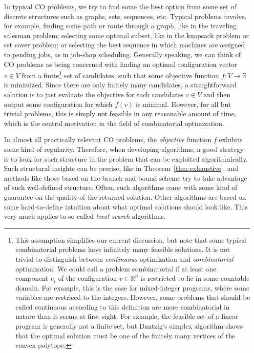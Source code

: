 \documentclass[a4paper]{report}
\theoremstyle{definition}
\theoremstyle{plain}
\begin{document}
In typical CO problems, we try to find some the best option from some set of
discrete structures such as graphs, sets, sequences, etc.
%
Typical problems involve, for example, finding some path or route through a
graph, like in the traveling salesman problem; selecting some optimal subset,
like in the knapsack problem or set cover problem; or selecting the best
sequence in which machines are assigned to pending jobs, as in job-shop
scheduling.
%
Generally speaking, we can think of CO problems as being concerned with finding
an optimal configuration vector $v \in V$ from a finite\footnote{This assumption
  simplifies our current discussion, but note that some typical combinatorial
  problems have infinitely many feasible solutions.
%
  It is not trivial to distinguish between \emph{continuous} optimization
  and \emph{combinatorial} optimization.
%
  We could call a problem combinatorial if at least one component $v_i$ of the
  configuration $v \in \mathbb{R}^n$ is restricted to lie in some countable domain.
%
  For example, this is the case for mixed-integer programs, where some
  variables are restriced to the integers.
%
  However, some problems that should be called continuous according to this
  definition are more combinatorial in nature than it seems at first sight. For
  example, the feasible set of a linear program is generally not a finite set,
  but Dantzig's simplex algorithm shows that the optimal solution must be one of
  the finitely many vertices of the convex polytope.} set of candidates, such
that some objective function $f : V \rightarrow \mathbb{R}$ is minimized.
%
Since there are only finitely many candidates, a straightforward solution is to
just evaluate the objective for each candidates $v \in V$ and then output some
configuration for which $f(v)$ is minimal.
%
However, for all but trivial problems, this is simply not feasible in any
reasonable amount of time, which is the central motivation in the field of
combinatorial optimization.

In almost all practically relevant CO problems, the \emph{objective} function
$f$ exhibits some kind of regularity.
%
Therefore, when developing algorithms, a good strategy is to look for such
structure in the problem that can be exploited algorithmically.
%
Such structural insights can be precise, like in Theorem~\ref{thm:exhaustive}, and methods like
those based on the branch-and-bound scheme try to take advantage of such
well-defined structure. Often, such algorithms come with some kind of guarantee
on the quality of the returned solution.
%
Other algorithms are based on some hard-to-define intuition about what optimal
solutions should look like.
%
This very much applies to so-called \emph{local search} algorithms.
\end{document}
